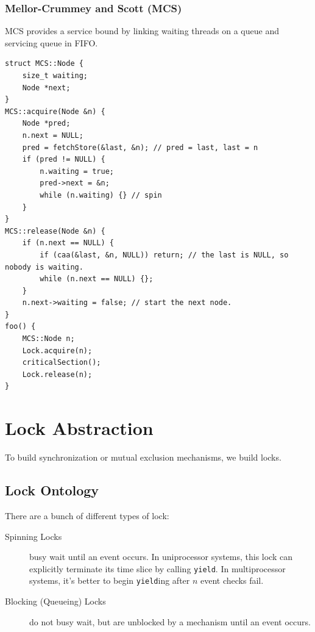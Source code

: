             \subsection{Mellor-Crummey and Scott (MCS)} %
            \label{sub:mellor_crummey_and_scott_mcs}
                MCS provides a service bound by linking waiting threads on a queue and servicing queue in FIFO.
                \begin{lstlisting}
struct MCS::Node {
    size_t waiting;
    Node *next;
}
MCS::acquire(Node &n) {
    Node *pred;
    n.next = NULL;
    pred = fetchStore(&last, &n); // pred = last, last = n
    if (pred != NULL) {
        n.waiting = true;
        pred->next = &n;
        while (n.waiting) {} // spin
    }
}
MCS::release(Node &n) {
    if (n.next == NULL) {
        if (caa(&last, &n, NULL)) return; // the last is NULL, so nobody is waiting.
        while (n.next == NULL) {};
    }
    n.next->waiting = false; // start the next node.
}
foo() {
    MCS::Node n;
    Lock.acquire(n);
    criticalSection();
    Lock.release(n);
}
                \end{lstlisting}
    \chapter{Lock Abstraction} %
    \label{cha:lock_abstraction}
        To build synchronization or mutual exclusion mechanisms, we build locks.
        \section{Lock Ontology} %
        \label{sec:lock_ontology}
            There are a bunch of different types of lock:

            \begin{description}
                \item[Spinning Locks] busy wait until an event occurs.
                In uniprocessor systems, this lock can explicitly terminate its time slice by calling \verb|yield|.
                In multiprocessor systems, it's better to begin \verb|yield|ing after $n$ event checks fail.
                \item[Blocking (Queueing) Locks] do not busy wait, but are unblocked by a mechanism until an event occurs.
            \end{description}
